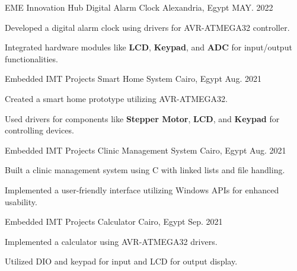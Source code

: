 \begin{cventries}
{}
\cventry
{\normalsize EME Innovation Hub} %
{\Large Digital Alarm Clock } %
{\normalsize Alexandria, Egypt} %
{\normalsize MAY. 2022} %
{
      \begin{cvitems} %
        \item {Developed a digital alarm clock using drivers for AVR-ATMEGA32 controller.}
    \item {Integrated hardware modules like \textbf{LCD}, \textbf{Keypad}, and \textbf{ADC} for input/output functionalities.}
      \end{cvitems}
}  
\cventry
{\normalsize Embedded IMT Projects} %
{\Large Smart Home System} %
{\normalsize Cairo, Egypt} %
{\normalsize Aug. 2021} %
{
  \begin{cvitems} %
    \item {Created a smart home prototype utilizing AVR-ATMEGA32.}
    \item {Used drivers for components like \textbf{Stepper Motor}, \textbf{LCD}, and \textbf{Keypad} for controlling devices.}
  \end{cvitems}
}
\cventry
{\normalsize Embedded IMT Projects} %
{\Large Clinic Management System} %
{\normalsize Cairo, Egypt} %
{\normalsize Aug. 2021} %
{
  \begin{cvitems} %
    \item {Built a clinic management system using C with linked lists and file handling.}
    \item {Implemented a user-friendly interface utilizing Windows APIs for enhanced usability.}
  \end{cvitems}
}
\cventry
{\normalsize Embedded IMT Projects} %
{\Large Calculator} %
{\normalsize Cairo, Egypt} %
{\normalsize Sep. 2021} %
{
  \begin{cvitems} %
    \item {\normalsize Implemented a calculator using AVR-ATMEGA32 drivers.}
    \item {\normalsize Utilized DIO and keypad for input and LCD for output display.}
  \end{cvitems}
}


\end{cventries}
